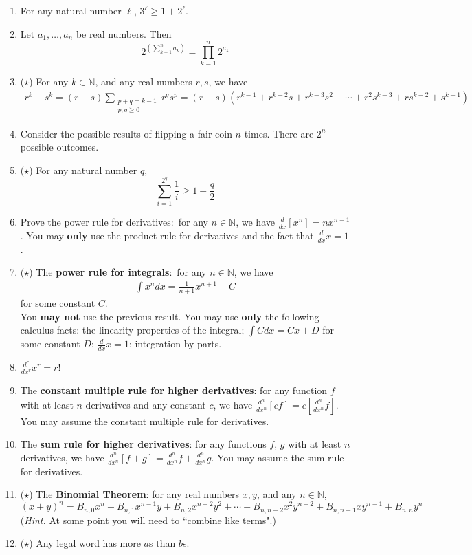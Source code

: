 \documentclass[11pt]{letter}
\theoremstyle{definition}
\begin{document}
\begin{description}
\begin{enumerate}
			\item For any natural number $\ell$, $3^\ell\geq 1+2^\ell$.
			\item Let $a_1,\ldots, a_n$ be real numbers. Then
				$$2^{\left(\sum_{k=1}^n a_k\right)}=\prod_{k=1}^n 2^{a_k}$$
			\item ($\star$) For any $k\in\mathbb{N}$, and any real numbers $r,s$, we have 
				\begin{align*}
					r^k-s^k=(r-s)\sum_{\substack{p+q=k-1\\p,q\geq 0}} r^qs^p=(r-s)\left(r^{k-1}+r^{k-2}s+r^{k-3}s^2+\cdots+r^2s^{k-3}+rs^{k-2}+s^{k-1}\right)
				\end{align*}
			\item Consider the possible results of flipping a fair coin $n$ times. There are $2^n$ possible outcomes. 
			\item ($\star$) For any natural number $q$, $$\sum_{i=1}^{2^q}\frac{1}{i}\geq 1+\frac{q}{2}$$
			\item Prove the power rule for derivatives:~for any $n\in\mathbb{N}$, we have $\frac{d}{dx}[x^n]=nx^{n-1}$. You may {\bfseries only} use the product rule for derivatives and the fact that $\frac{d}{dx}x=1$.
			 \item ($\star$) The {\bfseries power rule for integrals}:~for any $n\in\mathbb{N}$, we have 
				\begin{align*}
					\int x^ndx=\frac{1}{n+1}x^{n+1}+C
				\end{align*}
				for some constant $C$.\\
				You {\bfseries may not} use the previous result. You may use {\bfseries only} the following calculus facts: the linearity properties of the integral; $\int C dx=Cx+D$ for some constant $D$; $\frac{d}{dx} x=1$; integration by parts.
			\item $\frac{d^r}{dx^r}x^r=r!$
			\item The {\bfseries constant multiple rule for higher derivatives}: for any function $f$ with at least $n$ derivatives and any constant $c$, we have $\frac{d^n}{dx^n}\left[cf\right]=c\left[\frac{d^n}{dx^n}f\right]$. You may assume the constant multiple rule for derivatives.
			\item The {\bfseries sum rule for higher derivatives}: for any functions $f$, $g$ with at least $n$ derivatives, we have $\frac{d^n}{dx^n}\left[f+g\right]=\frac{d^n}{dx^n}f+\frac{d^n}{dx^n}g$. You may assume the sum rule for derivatives.
			\item ($\star$) The {\bfseries Binomial Theorem}: for any real numbers $x,y$, and any $n\in\mathbb{N}$,
				\begin{equation*}
					(x+y)^n=B_{n,0}x^n +B_{n,1}x^{n-1}y+B_{n,2}x^{n-2}y^2+\cdots+B_{n,n-2}x^2y^{n-2}+B_{n,n-1}x y^{n-1}+B_{n,n}y^n
				\end{equation*}
				({\em Hint.} At some point you will need to ``combine like terms".)
			\item ($\star$) Any legal word has more $a$s than $b$s.
			\end{enumerate}
			
\end{description}
\end{document}
